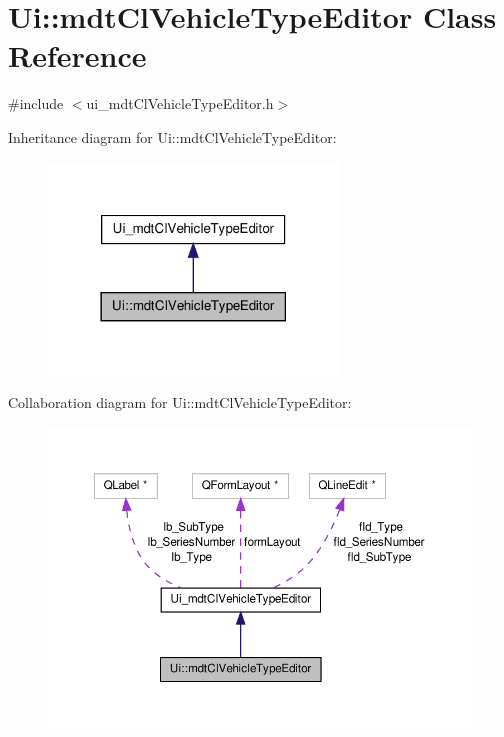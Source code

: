 \hypertarget{class_ui_1_1mdt_cl_vehicle_type_editor}{\section{Ui\-:\-:mdt\-Cl\-Vehicle\-Type\-Editor Class Reference}
\label{class_ui_1_1mdt_cl_vehicle_type_editor}
}


{\ttfamily \#include $<$ui\-\_\-mdt\-Cl\-Vehicle\-Type\-Editor.\-h$>$}



Inheritance diagram for Ui\-:\-:mdt\-Cl\-Vehicle\-Type\-Editor\-:\nopagebreak
\begin{figure}[H]
\begin{center}
\leavevmode
\includegraphics[width=218pt]{class_ui_1_1mdt_cl_vehicle_type_editor__inherit__graph}
\end{center}
\end{figure}


Collaboration diagram for Ui\-:\-:mdt\-Cl\-Vehicle\-Type\-Editor\-:\nopagebreak
\begin{figure}[H]
\begin{center}
\leavevmode
\includegraphics[width=350pt]{class_ui_1_1mdt_cl_vehicle_type_editor__coll__graph}
\end{center}
\end{figure}
